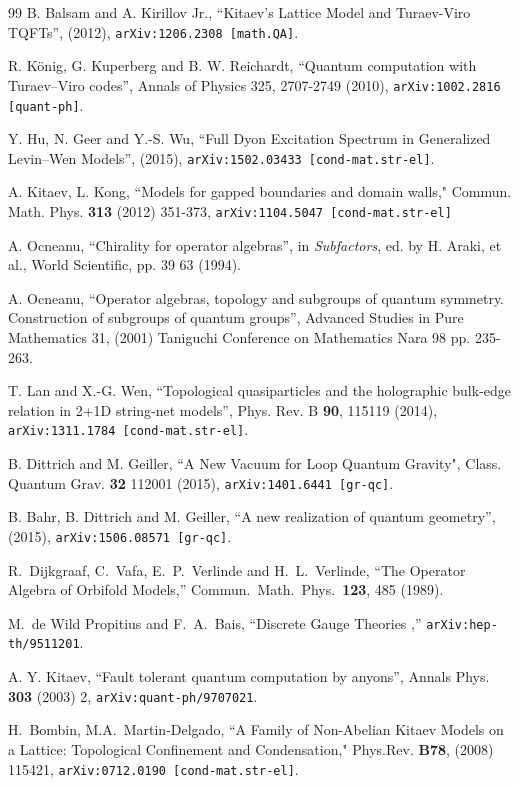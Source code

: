 \documentclass[nofootinbib,superscriptaddress,eqsecnum,tightenlines,11pt]{revtex4-1}
\begin{document}
\begin{thebibliography}{99}
B. Balsam and A. Kirillov Jr.,
``Kitaev's Lattice Model and Turaev-Viro TQFTs'',
(2012), \texttt{arXiv:1206.2308 [math.QA]}.

R. K\"onig, G. Kuperberg and B. W. Reichardt,
``Quantum computation with Turaev--Viro codes'',
Annals of Physics 325, 2707-2749 (2010), \texttt{arXiv:1002.2816 [quant-ph]}.

 Y. Hu, N. Geer and Y.-S. Wu,
``Full Dyon Excitation Spectrum in Generalized Levin--Wen Models'',
(2015), \texttt{arXiv:1502.03433 [cond-mat.str-el]}.

 A. Kitaev, L. Kong, ``Models for gapped boundaries and domain walls," Commun. Math. Phys. \textbf{313} (2012) 351-373, \texttt{arXiv:1104.5047 [cond-mat.str-el]}

   A. Ocneanu,
``Chirality for operator algebras'',
in \textit{Subfactors}, ed. by H. Araki, et al., World Scientific, pp. 39 63 (1994).

A. Ocneanu,
``Operator algebras, topology and subgroups of quantum symmetry. Construction of subgroups of quantum groups'',
Advanced Studies in Pure Mathematics 31, (2001) Taniguchi Conference on Mathematics Nara 98 pp. 235-263.

 T. Lan and X.-G. Wen,
``Topological quasiparticles and the holographic bulk-edge relation in 2+1D string-net models'',
Phys. Rev. B \textbf{90}, 115119 (2014), \texttt{arXiv:1311.1784 [cond-mat.str-el]}.

 B. Dittrich and M. Geiller,
``A New Vacuum for Loop Quantum Gravity",
Class. Quantum Grav. \textbf{32} 112001 (2015), \texttt{arXiv:1401.6441 [gr-qc]}.

 B. Bahr, B. Dittrich and M. Geiller,
``A new realization of quantum geometry'',
(2015), \texttt{arXiv:1506.08571 [gr-qc]}.

  R.~Dijkgraaf, C.~Vafa, E.~P.~Verlinde and H.~L.~Verlinde,
``The Operator Algebra of Orbifold Models,''
Commun.\ Math.\ Phys.\ {\bf 123}, 485 (1989).

 M.~de Wild Propitius and F.~A.~Bais,
  ``Discrete Gauge Theories ,''
  \texttt{arXiv:hep-th/9511201}.
  
 A. Y. Kitaev,
``Fault tolerant quantum computation by anyons'',
Annals Phys. \textbf{303} (2003) 2, \texttt{arXiv:quant-ph/9707021}.

H.~Bombin, M.A.~Martin-Delgado,
``A Family of Non-Abelian Kitaev Models on a Lattice: Topological Confinement and Condensation,"
Phys.Rev. {\bf B78}, (2008) 115421,
\texttt{arXiv:0712.0190 [cond-mat.str-el]}.
  

\end{thebibliography}
\end{document}
